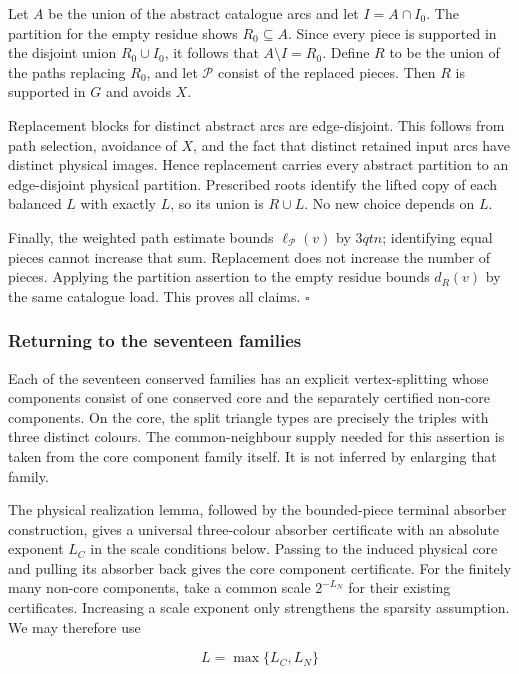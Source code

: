 \documentclass[english,11pt,a4paper]{article}
\begin{document}
Let \(A\) be the union of the abstract catalogue arcs and let \(I=A\cap I_0\). The partition for the empty residue shows \(R_0\subseteq A\). Since every piece is supported in the disjoint union \(R_0\cup I_0\), it follows that \(A\setminus I=R_0\). Define \(R\) to be the union of the paths replacing \(R_0\), and let \(\mathcal P\) consist of the replaced pieces. Then \(R\) is supported in \(G\) and avoids \(X\).

Replacement blocks for distinct abstract arcs are edge-disjoint. This follows from path selection, avoidance of \(X\), and the fact that distinct retained input arcs have distinct physical images. Hence replacement carries every abstract partition to an edge-disjoint physical partition. Prescribed roots identify the lifted copy of each balanced \(L\) with exactly \(L\), so its union is \(R\cup L\). No new choice depends on \(L\).

Finally, the weighted path estimate bounds \(\ell_{\mathcal P}(v)\) by \(3qtn\); identifying equal pieces cannot increase that sum. Replacement does not increase the number of pieces. Applying the partition assertion to the empty residue bounds \(d_R(v)\) by the same catalogue load. This proves all claims. \(\square\)

\subsubsection{Returning to the seventeen families}\label{returning-to-the-seventeen-families}

Each of the seventeen conserved families has an explicit vertex-splitting whose components consist of one conserved core and the separately certified non-core components. On the core, the split triangle types are precisely the triples with three distinct colours. The common-neighbour supply needed for this assertion is taken from the core component family itself. It is not inferred by enlarging that family.

The physical realization lemma, followed by the bounded-piece terminal absorber construction, gives a universal three-colour absorber certificate with an absolute exponent \(L_C\) in the scale conditions below. Passing to the induced physical core and pulling its absorber back gives the core component certificate. For the finitely many non-core components, take a common scale \(2^{-L_N}\) for their existing certificates. Increasing a scale exponent only strengthens the sparsity assumption. We may therefore use

\[L=\max\{L_C,L_N\}\]
\end{document}
